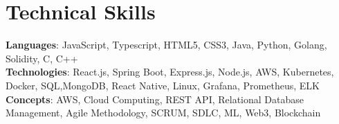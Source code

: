 \section{Technical Skills}
    \begin{itemize}[leftmargin=0.15in, label={}]
	\small{\item{
		\textbf{Languages}{: JavaScript, Typescript, HTML5, CSS3, Java, Python, Golang, Solidity, C, C++ } \\
		\textbf{Technologies}{: React.js, Spring Boot, Express.js, Node.js, AWS, Kubernetes, Docker, SQL,MongoDB, React Native, Linux, Grafana, Prometheus, ELK} \\
		\textbf{Concepts}{: AWS, Cloud Computing, REST API, Relational Database Management, Agile Methodology, SCRUM, SDLC, ML, Web3, Blockchain }
	}}
    \end{itemize}